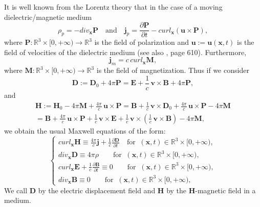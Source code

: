 \documentclass{article}
\theoremstyle{definition}
\theoremstyle{remark}
\renewcommand{\vec}[1]{\mathbf{#1}}
\newcommand{\R}{\mathbb{R}}
\newcommand{\R}{{\mathbb{R}}}
\begin{document}
It is well known from the Lorentz theory that in the case of a
moving dielectric/magnetic medium
\begin{equation}\label{PolarGG}
\rho_p=-div_{\vec x} \vec P\quad\text{and}\quad
\vec j_p=\frac{\partial \vec P}{\partial t}-curl_{\vec x}\left(
\vec u\times \vec P\right),
\end{equation}
where $\vec P:\R^3\times[0,+\infty)\to\R^3$ is the field of
polarization and $\vec u:=\vec u(\vec x,t)$ is the field of
velocities of the dielectric medium (see also \cite{PC}, page 610).
Furthermore,
\begin{equation}\label{MagnetGG}
\vec j_m=c\, curl_{\vec x} \vec M,
\end{equation}
where $\vec M:\R^3\times[0,+\infty)\to\R^3$ is the field of
magnetization. Thus if we consider
\begin{equation}\label{OprdddGG}
\vec D:=\vec D_0+4\pi \vec P=\vec E+\frac{1}{c}\,\vec v\times \vec
B+4\pi \vec P,
\end{equation}
and
\begin{multline}\label{Oprddd1GG}
\vec H:=\vec H_0-4\pi \vec M+\frac{4\pi}{c}\,\vec u\times \vec
P=\vec B+\frac{1}{c}\,\vec v\times \vec D_0+\frac{4\pi}{c}\,\vec
u\times \vec P-4\pi \vec M
\\=\vec B+\frac{4\pi}{c}\,\vec u\times \vec P+\frac{1}{c}\,\vec v\times
\vec E+\frac{1}{c}\,\vec v\times\left(\frac{1}{c}\,\vec v\times \vec
B\right)-4\pi \vec M,
\end{multline}
we obtain the usual Maxwell equations of the form:
\begin{equation}\label{MaxMedFullGG}
\begin{cases}
curl_{\vec x} \vec H\equiv \frac{4\pi}{c}\vec j+
\frac{1}{c}\frac{\partial \vec D}{\partial t}\quad\text{for}\;\;(\vec x,t)\in\R^3\times[0,+\infty),\\
div_{\vec x} \vec D\equiv 4\pi\rho\quad\quad\text{for}\;\;(\vec x,t)\in\R^3\times[0,+\infty),\\
curl_{\vec x} \vec E+\frac{1}{c}\frac{\partial \vec B}{\partial t}\equiv 0\quad\quad\text{for}\;\;(\vec x,t)\in\R^3\times[0,+\infty),\\
div_{\vec x} \vec B\equiv 0\quad\quad\text{for}\;\;(\vec
x,t)\in\R^3\times[0,+\infty),
\end{cases}
\end{equation}
We call $\vec D$ by the electric displacement field and $\vec H$ by
the $\vec H$-magnetic field in a medium.
\end{document}

